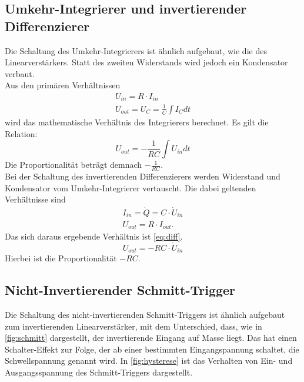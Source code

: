 \subsection{Umkehr-Integrierer und invertierender Differenzierer}
Die Schaltung des Umkehr-Integrierers ist ähnlich aufgebaut, wie die des Linearverstärkers.
Statt des zweiten Widerstands wird jedoch ein Kondensator verbaut.\\
Aus den primären Verhältnissen
\begin{equation}
    \begin{aligned}
        U_{in} = R\cdot I_{in}\\
        U_{out} = U_C = \frac{1}{C}\int I_C dt
    \end{aligned}
\end{equation}
wird das mathematische Verhältnis des Integrierers berechnet.
Es gilt die Relation:
\begin{equation}
    U_{out} = -\frac{1}{RC}\int U_{in} dt
    \label{eq:integrierer}
\end{equation}
Die Proportionalität beträgt demnach $-\frac{1}{RC}$.\\
\newline
Bei der Schaltung des invertierenden Differenzierers werden Widerstand und Kondensator vom Umkehr-Integrierer vertauscht.
Die dabei geltenden Verhältnisse sind
\begin{equation}
    \begin{aligned}
        I_{in} = \dot{Q} = C\cdot \dot{U}_{in}\\
        U_{out} = R\cdot I_{out}.
    \end{aligned}
\end{equation}
Das sich daraus ergebende Verhältnis ist \autoref{eq:diff}.
\begin{equation}
    U_{out} = -RC\cdot \dot{U}_{in}
    \label{eq:diff}
\end{equation}
Hierbei ist die Proportionalität $-RC$.

\subsection{Nicht-Invertierender Schmitt-Trigger}
Die Schaltung des nicht-invertierenden Schmitt-Triggers ist ähnlich aufgebaut zum invertierenden Linearverstärker, mit dem Unterschied, dass, wie in \autoref{fig:schmitt} dargestellt, der invertierende Eingang auf Masse liegt.
Das hat einen Schalter-Effekt zur Folge, der ab einer bestimmten Eingangspannung schaltet, die Schwellspannung genannt wird.
In \autoref{fig:hysterese} ist das Verhalten von Ein- und Ausgangsspannung des Schmitt-Triggers dargestellt.

